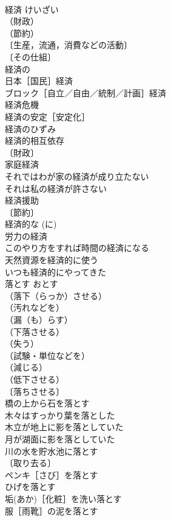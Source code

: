 \documentclass[8pt]{extreport}
\begin{document}
\begin{CJK}{UTF8}{min}
\\	経済	けいざい	
\\	（財政）
\\	（節約）
\\	〔生産，流通，消費などの活動〕
\\	〔その仕組〕
\\	経済の 
\\	日本［国民］経済 
\\	ブロック［自立／自由／統制／計画］経済 
\\	経済危機 
\\	経済の安定［安定化］ 
\\	経済のひずみ 
\\	経済的相互依存 
\\	〔財政〕
\\	家庭経済 
\\	それではわが家の経済が成り立たない 
\\	それは私の経済が許さない 
\\	経済援助 
\\	〔節約〕
\\	経済的な (に) 
\\	労力の経済 
\\	このやり方をすれば時間の経済になる 
\\	天然資源を経済的に使う 
\\	いつも経済的にやってきた 
\\	落とす	おとす	
\\	（落下（らっか）させる）
\\	（汚れなどを）
\\	（漏（も）らす）
\\	（下落させる）
\\	（失う）
\\	（試験・単位などを）
\\	（減じる）
\\	（低下させる）
\\	〔落ちさせる〕
\\	橋の上から石を落とす 
\\	木々はすっかり葉を落とした 
\\	木立が地上に影を落としていた 
\\	月が湖面に影を落としていた 
\\	川の水を貯水池に落とす 
\\	〔取り去る〕
\\	ペンキ［さび］を落とす 
\\	ひげを落とす 
\\	垢(あか)［化粧］を洗い落とす 
\\	服［雨靴］の泥を落とす 

\end{CJK}
\end{document}
